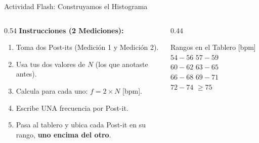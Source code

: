 \documentclass[aspectratio=169,xcolor=dvipsnames]{beamer}
\begin{document}
\begin{frame}{Actividad Flash: Construyamos el Histograma}
	\vspace{-0.2cm}
	\begin{columns}[T]
		\begin{column}{0.54\textwidth}
			\textbf{Instrucciones (2 Mediciones):}
			\vspace{0.1cm}
			\begin{enumerate}
				\item Toma dos Post-its (Medición 1 y Medición 2).
				\item Usa tus dos valores de $N$ (los que anotaste antes).
				\item Calcula para cada uno: $f = 2 \times N$ [bpm].
				\item Escribe UNA frecuencia por Post-it.
				\item Pasa al tablero y ubica cada Post-it en su rango, \textbf{uno encima del otro}.
			\end{enumerate}
		\end{column}
		
		\begin{column}{0.44\textwidth}
			\begin{block}{Rangos en el Tablero [bpm]}
				\centering
				\small
				\vspace{0.1cm}
				$54-56$ \hspace{0.3cm} $57-59$ \\
				\vspace{0.1cm}
				$60-62$ \hspace{0.3cm} $63-65$ \\
				\vspace{0.1cm}
				$66-68$ \hspace{0.3cm} $69-71$ \\
				\vspace{0.1cm}
				$72-74$ \hspace{0.3cm} $\ge 75$
				\vspace{0.1cm}
			\end{block}
		\end{column}
	\end{columns}
\end{frame}
\end{document}
